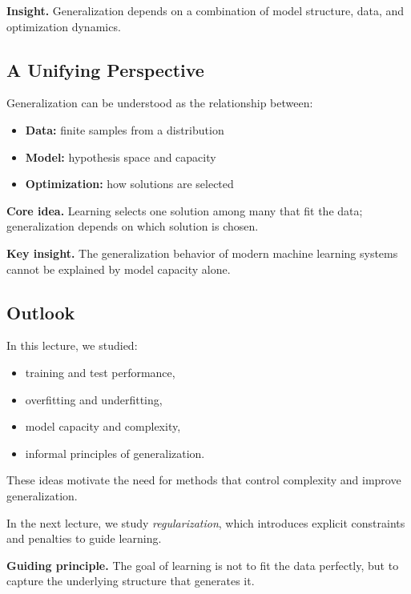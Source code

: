 \noindent
\textbf{Insight.}  
Generalization depends on a combination of model structure, data, and optimization dynamics.

\subsection{A Unifying Perspective}

Generalization can be understood as the relationship between:

\begin{itemize}
    \item \textbf{Data:} finite samples from a distribution
    \item \textbf{Model:} hypothesis space and capacity
    \item \textbf{Optimization:} how solutions are selected
\end{itemize}

\medskip

\noindent
\textbf{Core idea.}  
Learning selects one solution among many that fit the data; generalization depends on which solution is chosen.

\medskip

\noindent
\textbf{Key insight.}  
The generalization behavior of modern machine learning systems cannot be explained by model capacity alone.

\subsection{Outlook}

In this lecture, we studied:

\begin{itemize}
    \item training and test performance,
    \item overfitting and underfitting,
    \item model capacity and complexity,
    \item informal principles of generalization.
\end{itemize}

\medskip

\noindent
These ideas motivate the need for methods that control complexity and improve generalization.

\medskip

\noindent
In the next lecture, we study \emph{regularization}, which introduces explicit constraints and penalties to guide learning.

\medskip

\noindent
\textbf{Guiding principle.}  
The goal of learning is not to fit the data perfectly, but to capture the underlying structure that generates it.